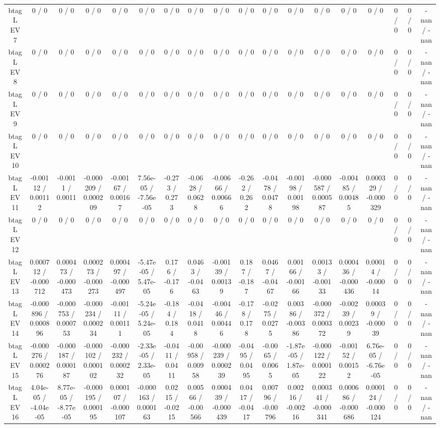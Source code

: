 \documentclass[10pt]{article}
\begin{document}
\begin{table}[htbp]
\begin{center}
\begin{tabular}{|c|c|c|c|c|c|c|c|c|c|c|c|c|c|c|c|c|c|}
  btag L EV 7 & 0 / 0 & 0 / 0 & 0 / 0 & 0 / 0 & 0 / 0 & 0 / 0 & 0 / 0 & 0 / 0 & 0 / 0 & 0 / 0 & 0 / 0 & 0 / 0 & 0 / 0 & 0 / 0 & 0 / 0 & 0 / 0 & -nan / -nan \\ 
  btag L EV 8 & 0 / 0 & 0 / 0 & 0 / 0 & 0 / 0 & 0 / 0 & 0 / 0 & 0 / 0 & 0 / 0 & 0 / 0 & 0 / 0 & 0 / 0 & 0 / 0 & 0 / 0 & 0 / 0 & 0 / 0 & 0 / 0 & -nan / -nan \\ 
  btag L EV 9 & 0 / 0 & 0 / 0 & 0 / 0 & 0 / 0 & 0 / 0 & 0 / 0 & 0 / 0 & 0 / 0 & 0 / 0 & 0 / 0 & 0 / 0 & 0 / 0 & 0 / 0 & 0 / 0 & 0 / 0 & 0 / 0 & -nan / -nan \\ 
  btag L EV 10 & 0 / 0 & 0 / 0 & 0 / 0 & 0 / 0 & 0 / 0 & 0 / 0 & 0 / 0 & 0 / 0 & 0 / 0 & 0 / 0 & 0 / 0 & 0 / 0 & 0 / 0 & 0 / 0 & 0 / 0 & 0 / 0 & -nan / -nan \\ 
  btag L EV 11 & -0.00112 / 0.00112 & -0.0011 / 0.0011 & -0.000209 / 0.000209 & -0.00167 / 0.00167 & 7.56e-05 / -7.56e-05 & -0.273 / 0.273 & -0.0628 / 0.0628 & -0.00666 / 0.00666 & -0.262 / 0.262 & -0.0478 / 0.0478 & -0.00198 / 0.00198 & -0.000587 / 0.000587 & -0.00485 / 0.00485 & 0.000329 / -0.000329 & 0 / 0 & 0 / 0 & -nan / -nan \\ 
  btag L EV 12 & 0 / 0 & 0 / 0 & 0 / 0 & 0 / 0 & 0 / 0 & 0 / 0 & 0 / 0 & 0 / 0 & 0 / 0 & 0 / 0 & 0 / 0 & 0 / 0 & 0 / 0 & 0 / 0 & 0 / 0 & 0 / 0 & -nan / -nan \\ 
  btag L EV 13 & 0.000712 / -0.000712 & 0.000473 / -0.000473 & 0.000273 / -0.000273 & 0.000497 / -0.000497 & -5.47e-05 / 5.47e-05 & 0.176 / -0.176 & 0.0463 / -0.0463 & -0.00139 / 0.00139 & 0.187 / -0.187 & 0.0467 / -0.0467 & 0.00166 / -0.00166 & 0.00133 / -0.00133 & 0.000436 / -0.000436 & 0.00014 / -0.00014 & 0 / 0 & 0 / 0 & -nan / -nan \\ 
  btag L EV 14 & -0.000896 / 0.000896 & -0.000753 / 0.000753 & -0.000234 / 0.000234 & -0.00111 / 0.00111 & -5.24e-05 / 5.24e-05 & -0.184 / 0.184 & -0.0418 / 0.0418 & -0.00446 / 0.00446 & -0.178 / 0.178 & -0.0275 / 0.0275 & 0.00386 / -0.00386 & -0.000372 / 0.000372 & -0.00239 / 0.00239 & 0.00039 / -0.00039 & 0 / 0 & 0 / 0 & -nan / -nan \\ 
  btag L EV 15 & -0.000276 / 0.000276 & -0.000187 / 0.000187 & -0.000102 / 0.000102 & -0.000232 / 0.000232 & -2.33e-05 / 2.33e-05 & -0.0411 / 0.0411 & -0.00958 / 0.00958 & -0.000239 / 0.000239 & -0.0495 / 0.0495 & -0.0065 / 0.0065 & -1.87e-05 / 1.87e-05 & -0.000122 / 0.000122 & -0.00152 / 0.00152 & 6.76e-05 / -6.76e-05 & 0 / 0 & 0 / 0 & -nan / -nan \\ 
  btag L EV 16 & 4.04e-05 / -4.04e-05 & 8.77e-05 / -8.77e-05 & -0.000195 / 0.000195 & 0.000107 / -0.000107 & -0.000163 / 0.000163 & 0.0215 / -0.0215 & 0.00566 / -0.00566 & 0.000439 / -0.000439 & 0.0417 / -0.0417 & 0.00796 / -0.00796 & 0.00216 / -0.00216 & 0.000341 / -0.000341 & 0.000686 / -0.000686 & 0.000124 / -0.000124 & 0 / 0 & 0 / 0 & -nan / -nan \\ 

\end{tabular}
\end{center}
\end{table}
\end{document}
